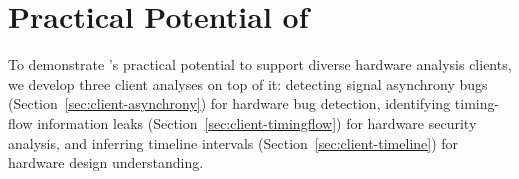 \section{Practical Potential of \tia}\label{sec:clients}

To demonstrate \tia's practical potential to support diverse hardware analysis clients, we develop three client analyses on top of it: detecting signal asynchrony bugs (Section~\ref{sec:client-asynchrony}) for hardware bug detection, identifying timing-flow information leaks (Section~\ref{sec:client-timingflow}) for hardware security analysis, and inferring timeline intervals (Section~\ref{sec:client-timeline}) for hardware design understanding.




